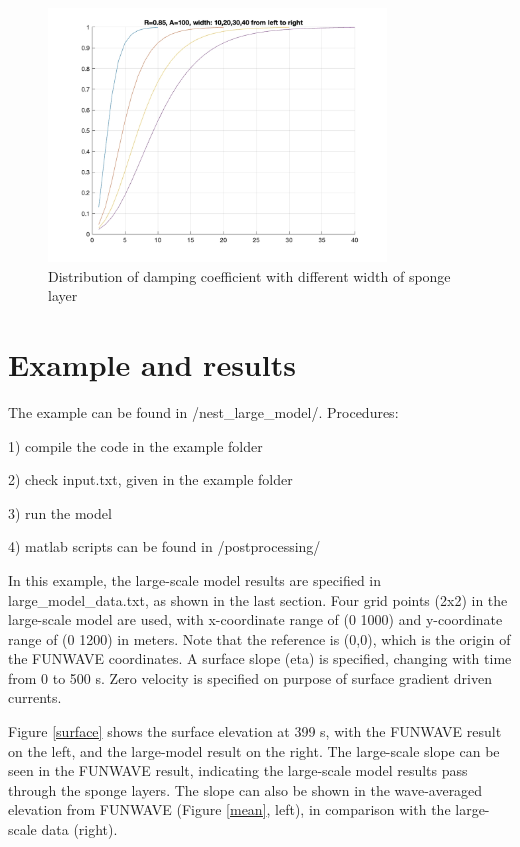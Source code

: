 \documentclass[preprint,10pt]{elsarticle}
\begin{document}
  \begin{figure}
\begin{center}
 \includegraphics[width=0.8\textwidth]{figures/test_sponge_width.jpg}
 \caption{Distribution of damping coefficient with different width of sponge layer }
 \label{width}
 \end{center}
 \end{figure}  
   
\section{Example and results}

The example can be found in /nest\_large\_model/. Procedures:

1) compile the code in the example folder

2) check input.txt, given in the example folder

3) run the model

4) matlab scripts can be found in /postprocessing/

\vspace{0.5cm}
\noindent
In this example,  the large-scale model results are specified in large\_model\_data.txt, as shown in the last section. Four grid points (2x2) in the large-scale model  are used, with x-coordinate range of (0 1000) and y-coordinate range of (0 1200) in meters. Note that the reference is (0,0), which is the origin of the FUNWAVE coordinates. A surface slope (eta) is specified, changing with time from 0 to 500 s. Zero velocity is specified on purpose of surface gradient driven currents. 

Figure \ref{surface} shows the surface elevation at 399 s, with the FUNWAVE result on the left, and the large-model result on the right. The large-scale slope can be seen in the FUNWAVE result, indicating the large-scale model results pass through the sponge layers. The slope can also be shown in the wave-averaged elevation from FUNWAVE (Figure \ref{mean}, left), in comparison with the large-scale data (right). 
\end{document}
